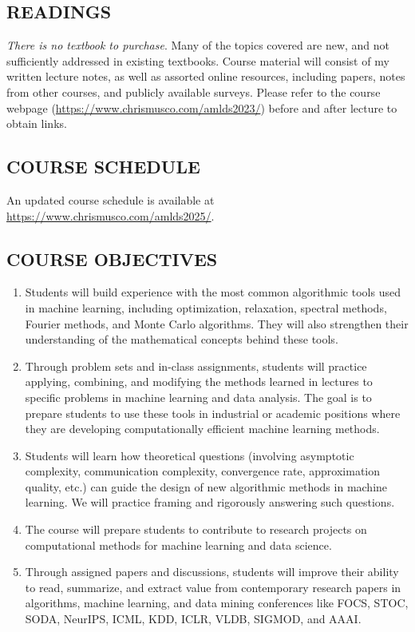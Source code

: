 \documentclass[10pt]{article}
\begin{document}
\subsection{READINGS}
\textit{There is no textbook to purchase}. Many of the topics covered are new, and not sufficiently addressed in existing textbooks. Course material will consist of my written lecture notes, as well as assorted online resources, including papers, notes from other courses, and publicly available surveys. Please refer to the course webpage (\url{https://www.chrismusco.com/amlds2023/}) before and after lecture to obtain links.


\subsection{COURSE SCHEDULE}
\begin{center}
An updated course schedule is available at \href{https://www.chrismusco.com/amlds2023/}{https://www.chrismusco.com/amlds2025/}.
\end{center}

\subsection{COURSE OBJECTIVES}
\begin{enumerate}
	\item Students will build experience with the most common algorithmic tools used in machine learning, including optimization, relaxation, spectral methods, Fourier methods, and Monte Carlo algorithms. They will also strengthen their understanding of the mathematical concepts behind these tools.
	
	\item Through problem sets and in-class assignments, students will practice applying, combining, and modifying the methods learned in lectures to specific problems in machine learning and data analysis. The goal is to prepare students to use these tools in industrial or academic positions where they are developing computationally efficient machine learning methods.
	
	\item Students will learn how theoretical questions (involving asymptotic complexity, communication complexity, convergence rate, approximation quality, etc.) can guide the design of new algorithmic methods in machine learning. We will practice framing and rigorously answering such questions.
	
	\item The course will prepare students to contribute to research projects on computational methods for machine learning and data science.
	
	\item Through assigned papers and discussions, students will improve their ability to read, summarize, and extract value from contemporary research papers in algorithms, machine learning, and data mining conferences like FOCS, STOC, SODA, NeurIPS, ICML, KDD, ICLR, VLDB, SIGMOD, and AAAI.
\end{enumerate}
\end{document}
